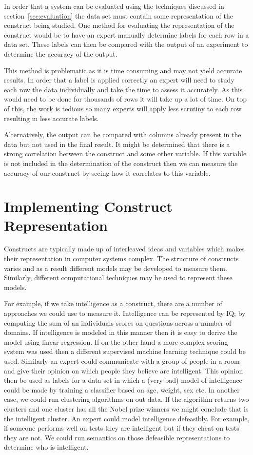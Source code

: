 In order that a system can be evaluated using the techniques discussed in  section~\ref{sec:evaluation} the data set must contain some representation of the construct being studied. One method for evaluating the representation of the construct would be to have an expert manually determine labels for each row in a data set. These labels can then be compared with the output of an experiment to determine the accuracy of the output. 

This method is problematic as it is time consuming and may not yield accurate results. In order that a label is applied correctly an expert will need to study each row the data individually and take the time to assess it accurately. As this would need to be done for thousands of rows it will take up a lot of time. On top of this, the work is tedious so many experts will apply less scrutiny to each row resulting in less accurate labels.

Alternatively, the output can be compared with columns already present in the data but not used in the final result. It might be determined that there is a strong correlation between the construct and some other variable. If this variable is not included in the determination of the construct then we can measure the accuracy of our construct by seeing how it correlates to this variable.

\section{Implementing Construct Representation}

Constructs are typically made up of interleaved ideas and variables which makes their representation in computer systems complex. The structure of constructs varies and as a result different models may be developed to measure them. Similarly, different computational techniques may be used to represent these models.

For example, if we take intelligence as a construct, there are a number of approaches we could use to measure it. Intelligence can be represented by IQ; by computing the sum of an individuals scores on questions across a number of domains. If intelligence is modeled in this manner then it is easy to derive the model using linear regression. If on the other hand a more complex scoring system was used then a different supervised machine learning technique could be used. Similarly an expert could communicate with a group of people in a room and give their opinion on which people they believe are intelligent. This opinion then be used as labels for a data set in which a (very bad) model of intelligence could be made by training a classifier based on age, weight, sex etc. In another case, we could run clustering algorithms on out data. If the algorithm returns two clusters and one cluster has all the Nobel prize winners we might conclude that is the intelligent cluster. An expert could model intelligence defeasibly. For example, if someone performs well on tests they are intelligent but if they cheat on tests they are not. We could run semantics on those defeasible representations to determine who is intelligent.

